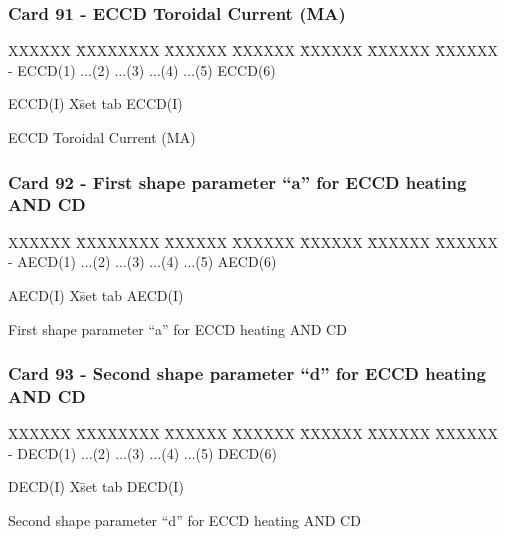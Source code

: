 \subsubsection{Card 91 - ECCD Toroidal Current (MA)}
\begin{tabbing}
XXXXXX \= XXXXXXXX \= XXXXXX \= XXXXXX \= XXXXXX \= XXXXXX \=
XXXXXX       \\
\footnotesize - \>\footnotesize  ECCD(1) \>\footnotesize $\ldots$(2) \>\footnotesize
$\ldots$(3) \>\footnotesize $\ldots$(4) \>\footnotesize $\ldots$(5) \>\footnotesize ECCD(6)
\\
\end{tabbing}
\begin{tabbing}
ECCD(I) X\= set tab \kill
ECCD(I) \> \parbox[t]{\width}{
ECCD Toroidal Current (MA)
}
\end{tabbing}

\subsubsection{Card 92 -  First shape parameter “a” for ECCD heating AND CD}
\begin{tabbing}
XXXXXX \= XXXXXXXX \= XXXXXX \= XXXXXX \= XXXXXX \= XXXXXX \=
XXXXXX       \\
\footnotesize - \>\footnotesize  AECD(1) \>\footnotesize $\ldots$(2) \>\footnotesize
$\ldots$(3) \>\footnotesize $\ldots$(4) \>\footnotesize $\ldots$(5) \>\footnotesize AECD(6)
\\
\end{tabbing}
\begin{tabbing}
AECD(I) X\= set tab \kill
AECD(I) \> \parbox[t]{\width}{
First shape parameter “a” for ECCD heating AND CD
}
\end{tabbing}

\subsubsection{Card 93 -  Second shape parameter “d” for ECCD heating AND CD}
\begin{tabbing}
XXXXXX \= XXXXXXXX \= XXXXXX \= XXXXXX \= XXXXXX \= XXXXXX \=
XXXXXX       \\
\footnotesize - \>\footnotesize  DECD(1) \>\footnotesize $\ldots$(2) \>\footnotesize
$\ldots$(3) \>\footnotesize $\ldots$(4) \>\footnotesize $\ldots$(5) \>\footnotesize DECD(6)
\\
\end{tabbing}
\begin{tabbing}
DECD(I) X\= set tab \kill
DECD(I) \> \parbox[t]{\width}{
Second shape parameter “d” for ECCD heating AND CD
}
\end{tabbing}

